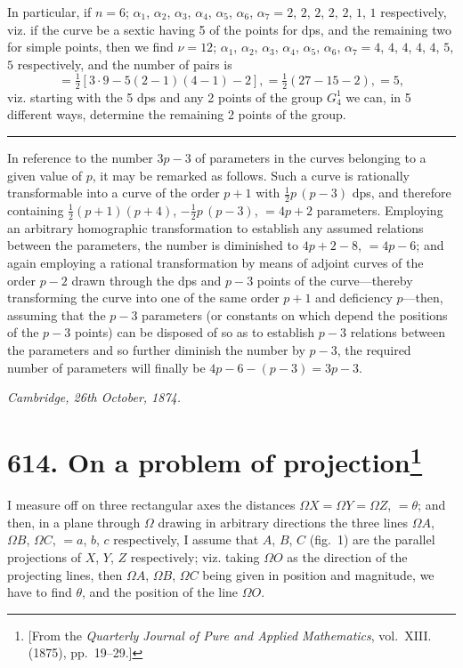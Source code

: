 \documentclass[11pt,a4paper]{book}
\begin{document}
In particular, if $n = 6$; $\alpha_1$, $\alpha_2$, $\alpha_3$, $\alpha_4$, $\alpha_5$, $\alpha_6$, $\alpha_7 = 2$, $2$, $2$, $2$, $2$, $1$, $1$ respectively, viz. if the curve be a sextic having 5 of the points for dps, and the remaining two for simple points, then we find $\nu = 12$; $\alpha_1$, $\alpha_2$, $\alpha_3$, $\alpha_4$, $\alpha_5$, $\alpha_6$, $\alpha_7 = 4$, $4$, $4$, $4$, $4$, $5$, $5$ respectively, and the number of pairs is
\[
= \tfrac{1}{2}[3 \cdot 9 - 5(2-1)(4-1) - 2], = \tfrac{1}{2}(27 - 15 - 2), = 5,
\]
viz. starting with the 5 dps and any 2 points of the group $G_4^1$ we can, in 5 different ways, determine the remaining 2 points of the group.

\rule{4cm}{0.4pt}

In reference to the number $3p-3$ of parameters in the curves belonging to a given value of $p$, it may be remarked as follows. Such a curve is rationally transformable into a curve of the order $p+1$ with $\frac{1}{2}p\,(p-3)$ dps, and therefore containing $\frac{1}{2}(p+1)(p+4)$, $-\frac{1}{2}p\,(p-3)$, $= 4p+2$ parameters. Employing an arbitrary homographic transformation to establish any assumed relations between the parameters, the number is diminished to $4p+2-8$, $= 4p-6$; and again employing a rational transformation by means of adjoint curves of the order $p-2$ drawn through the dps and $p-3$ points of the curve---thereby transforming the curve into one of the same order $p+1$ and deficiency $p$---then, assuming that the $p-3$ parameters (or constants on which depend the positions of the $p-3$ points) can be disposed of so as to establish $p-3$ relations between the parameters and so further diminish the number by $p-3$, the required number of parameters will finally be $4p-6-(p-3) = 3p-3$.

\begin{flushright}
\textit{Cambridge, 26th October, 1874.}
\end{flushright}

\newpage
\section[On a problem of projection]{\textbf{614.} On a problem of projection\footnote{[From the \textit{Quarterly Journal of Pure and Applied Mathematics}, vol.~XIII. (1875), pp.~19--29.]}}

I measure off on three rectangular axes the distances $\Omega X = \Omega Y = \Omega Z$, $= \theta$; and then, in a plane through $\Omega$ drawing in arbitrary directions the three lines $\Omega A$, $\Omega B$, $\Omega C$, $= a$, $b$, $c$ respectively, I assume that $A$, $B$, $C$ (fig.~1) are the parallel projections of $X$, $Y$, $Z$ respectively; viz. taking $\Omega O$ as the direction of the projecting lines, then $\Omega A$, $\Omega B$, $\Omega C$ being given in position and magnitude, we have to find $\theta$, and the position of the line $\Omega O$.
\end{document}
